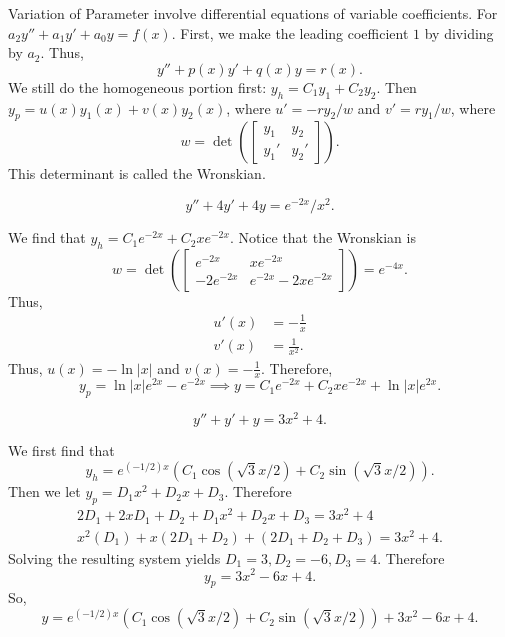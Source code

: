 \begin{definition}
    \alert{Variation of Parameter} involve differential equations
    of variable coefficients. For $a_2y''+a_1y'+a_0y=f(x)$. First,
    we make the leading coefficient $1$ by dividing by $a_2$. Thus,
    $$y'' + p(x)y' + q(x)y = r(x).$$ We still do the homogeneous
    portion first: $y_h = C_1y_1+C_2y_2$. Then $y_p = u(x)y_1(x)+v(x)y_2(x)$,
    where $u' = -ry_2/w$ and $v'=ry_1/w$, where 
    $$w = \det \left( \begin{bmatrix} y_1 & y_2 \\ y_1' & y_2' \end{bmatrix}\right).$$
    This determinant is called the \alert{Wronskian}.
\end{definition}
\begin{example}
    $$y''+4y'+4y = e^{-2x}/x^2.$$
\end{example}
\begin{soln}
    We find that $y_h = C_1e^{-2x} + C_2xe^{-2x}$. Notice that the Wronskian
    is $$w =\det \left( \begin{bmatrix} e^{-2x} & xe^{-2x} \\ -2e^{-2x} & e^{-2x}-2xe^{-2x}
    \end{bmatrix}\right) = e^{-4x}.$$ Thus,
    \begin{align*}
        u'(x) &= -\frac{1}{x} \\
        v'(x) &= \frac{1}{x^2}.
    \end{align*}
    Thus, $u(x)=-\ln|x|$ and $v(x) = -\frac{1}{x}$. Therefore,
    $$y_p = \ln |x|e^{2x} - e^{-2x} \implies \boxed{y=C_1e^{-2x}+C_2xe^{-2x}+\ln|x|e^{2x}}.$$
\end{soln}
\begin{example}
    $$y''+y'+y = 3x^2+4.$$
\end{example}
\begin{soln}
    We first find that $$y_h = e^{(-1/2)x}\left( C_1\cos(\sqrt{3}x/2)+C_2\sin(\sqrt{3}x/2)\right).$$
    Then we let $y_p = D_1x^2+D_2x+D_3$. Therefore
    \begin{align*}
        2D_1+2xD_1+D_2+D_1x^2+D_2x+D_3 = 3x^2+4 \\
        x^2\left(D_1\right)+x\left(2D_1+D_2\right)+\left(2D_1+D_2+D_3\right)=3x^2+4.
    \end{align*}
    Solving the resulting system yields $D_1 = 3, D_2 = -6, D_3 = 4$.
    Therefore $$y_p = 3x^2-6x+4.$$ So,
    $$\boxed{y = e^{(-1/2)x}\left( C_1\cos(\sqrt{3}x/2)+C_2\sin(\sqrt{3}x/2)\right)+3x^2-6x+4}.$$
\end{soln}

